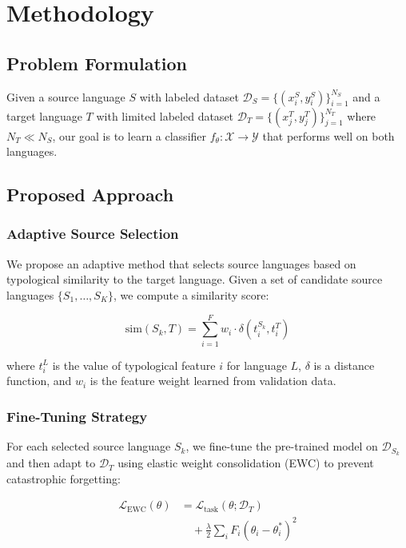 \chapter{Methodology}
\label{chap:methodology}

\section{Problem Formulation}

Given a source language $S$ with labeled dataset
$\mathcal{D}_S = \{(x_i^S, y_i^S)\}_{i=1}^{N_S}$ and a target
language $T$ with limited labeled dataset
$\mathcal{D}_T = \{(x_j^T, y_j^T)\}_{j=1}^{N_T}$ where
$N_T \ll N_S$, our goal is to learn a classifier
$f_\theta: \mathcal{X} \rightarrow \mathcal{Y}$ that performs well
on both languages.

\section{Proposed Approach}

\subsection{Adaptive Source Selection}

We propose an adaptive method that selects source languages based on
typological similarity to the target language.  Given a set of
candidate source languages $\{S_1, \ldots, S_K\}$, we compute a
similarity score:

\begin{equation}
    \text{sim}(S_k, T) = \sum_{i=1}^{F} w_i \cdot \delta(t_i^{S_k}, t_i^T)
    \label{eq:similarity}
\end{equation}

where $t_i^L$ is the value of typological feature $i$ for language
$L$, $\delta$ is a distance function, and $w_i$ is the feature weight
learned from validation data.

\subsection{Fine-Tuning Strategy}

For each selected source language $S_k$, we fine-tune the pre-trained
model on $\mathcal{D}_{S_k}$ and then adapt to $\mathcal{D}_T$ using
elastic weight consolidation (EWC) to prevent catastrophic forgetting:

\begin{align}
    \mathcal{L}_{\text{EWC}}(\theta) &= \mathcal{L}_{\text{task}}(\theta; \mathcal{D}_T) \nonumber \\
    &\quad + \frac{\lambda}{2} \sum_{i} F_i (\theta_i - \theta_i^{*})^2
    \label{eq:ewc}
\end{align}

